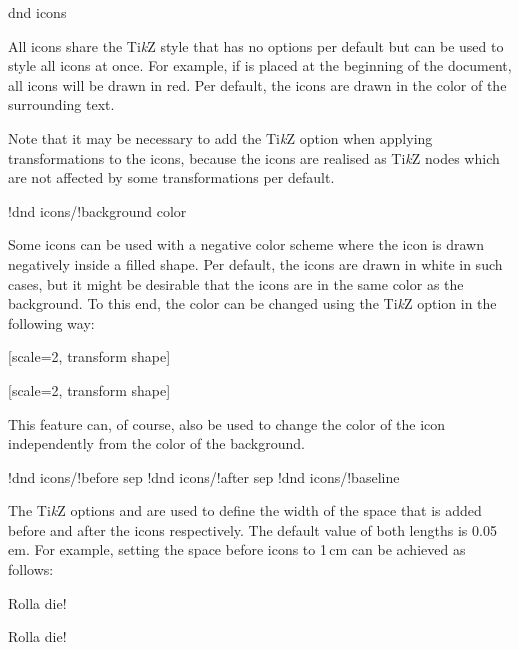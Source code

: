 \documentclass[a4paper]{article}
\begin{document}
\begin{macrodef}dnd icons\end{macrodef}
All icons share the Ti\emph{k}Z style  that has no options per default but can be used to style all icons at once. For example, if  is placed at the beginning of the document, all icons will be drawn in red. Per default, the icons are drawn in the color of the surrounding text. 

Note that it may be necessary to add the Ti\emph{k}Z option  when applying transformations to the icons, because the icons are realised as Ti\emph{k}Z nodes which are not affected by some transformations per default.

\begin{macrodef}!dnd icons/!background color\end{macrodef}
Some icons can be used with a negative color scheme where the icon is drawn negatively inside a filled shape. Per default, the icons are drawn in white in such cases, but it might be desirable that the icons are in the same color as the background. To this end, the color can be changed using the Ti\emph{k}Z option  in the following way:

\begin{codeexample}
\colorbox{blue!50}{%
        [scale=2, transform shape]%
}

\colorbox{blue!50}{%
        [scale=2, transform shape]%
}
\end{codeexample}
This feature can, of course, also be used to change the color of the icon independently from the color of the background.

\begin{macrodef}
!dnd icons/!before sep
!dnd icons/!after sep
!dnd icons/!baseline
\end{macrodef}
The Ti\emph{k}Z options  and  are used to define the width of the space that is added before and after the icons respectively. The default value of both lengths is 0.05\,em. For example, setting the space before icons to 1\,cm can be achieved as follows:

\begin{codeexample}
Rolla die!

Rolla die!
\end{codeexample}
\end{document}
